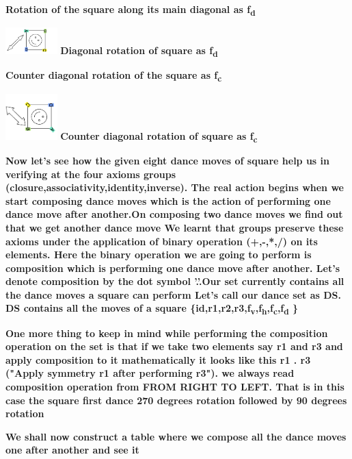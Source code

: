 \documentclass{article}
\begin{document}
\textbf{Rotation of the square along its main diagonal as f\textsubscript{d}}
\begin{center}
    \includegraphics[scale = 0.9, width = 2cm] {images/diagonal.png}
    \center\textbf{Diagonal rotation of square as f\textsubscript{d}}
\end{center}

\textbf{Counter diagonal rotation of the square as f\textsubscript{c}}
\begin{center}
    \includegraphics[scale = 0.9, width = 2cm] {images/counter_diagonal.png}
    \center\textbf{Counter diagonal rotation of square as f\textsubscript{c}}
\end{center}
\pagebreak
\textbf{Now let's see how the given eight dance moves of square help us in verifying at the four axioms groups (closure,associativity,identity,inverse). The real action begins when we start composing dance moves which is the action of performing one dance move after another.On composing two dance moves we find out that we get another dance move
    We learnt that groups preserve these axioms under the application of binary operation (+,-,*,/) on its elements. Here the binary operation we are going to perform is composition which is performing one dance move after another. Let's denote composition by the dot symbol '.'.Our set currently contains all the dance moves a square can perform
    Let's call our dance set as DS. DS contains all the moves of a square \{id,r1,r2,r3,f\textsubscript{v},f\textsubscript{h},f\textsubscript{c},f\textsubscript{d} \}}

\textbf{ One more thing to keep in mind while performing the composition operation on the set is that if we take two elements say r1 and r3 and apply composition to it mathematically it looks like this
    r1 . r3 ("Apply symmetry r1 after performing r3"). we always read composition operation from  FROM RIGHT TO LEFT. That is in this case the square first dance 270 degrees rotation followed by 90 degrees rotation
}

\textbf{We shall now construct a table where we compose all the dance moves one after another and see it }
\end{document}
